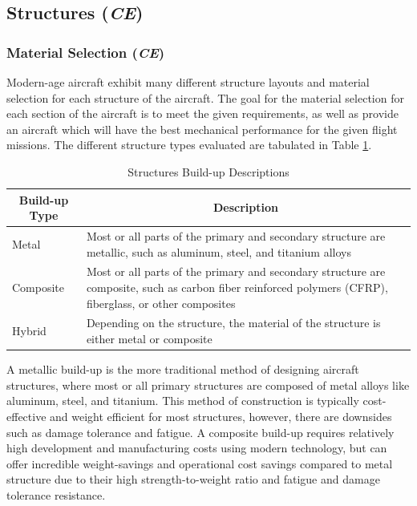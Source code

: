 \subsection{Structures (\textit{CE})}
\subsubsection{Material Selection (\textit{CE})}
Modern-age aircraft exhibit many different structure layouts and material selection for each structure of the aircraft. The goal for the material selection for each section of the aircraft is to meet the given requirements, as well as provide an aircraft which will have the best mechanical performance for the given flight missions. The different structure types evaluated are tabulated in Table \ref{tab:structure_material_table}.

\begin{table}[!h]
\centering
\caption{Structures Build-up Descriptions }
\label{tab:structure_material_table}
\begin{tabular}{ |p{2cm}||p{13cm}| }
\toprule
\multicolumn{1}{|c||}{\textbf{Build-up Type}} & \multicolumn{1}{c|}{\textbf{Description}}                                                                                                                       \\ \hline\hline
Metal                                       & Most or all parts of the primary and secondary structure are metallic, such as aluminum, steel, and titanium alloys                                             \\ \hline
Composite                                    & Most or all parts of the primary and secondary structure are composite, such as carbon fiber reinforced polymers (CFRP), fiberglass, or other composites \\ \hline
Hybrid                                       & Depending on the structure, the material of the structure is either metal or composite                                                                            \\ \bottomrule
\end{tabular}
\end{table}

A metallic build-up is the more traditional method of designing aircraft structures, where most or all primary structures are composed of metal alloys like aluminum, steel, and titanium. This method of construction is typically cost-effective and weight efficient for most structures, however, there are downsides such as damage tolerance and fatigue. A composite build-up requires relatively high development and manufacturing costs using modern technology, but can offer incredible weight-savings and operational cost savings compared to metal structure due to their high strength-to-weight ratio and fatigue and damage tolerance resistance. 

